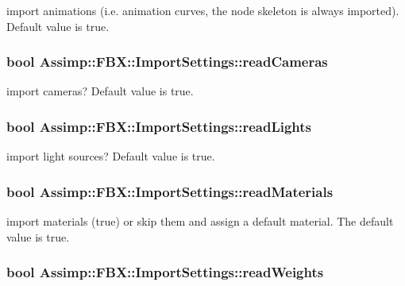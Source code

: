 import animations (i.\+e. animation curves, the node skeleton is always imported). Default value is true. \hypertarget{struct_assimp_1_1_f_b_x_1_1_import_settings_a79feafd0be973cb9b0023febe4ee3b7b}{
\subsubsection[{read\+Cameras}]{\setlength{\rightskip}{0pt plus 5cm}bool Assimp\+::\+F\+B\+X\+::\+Import\+Settings\+::read\+Cameras}}\label{struct_assimp_1_1_f_b_x_1_1_import_settings_a79feafd0be973cb9b0023febe4ee3b7b}
import cameras? Default value is true. \hypertarget{struct_assimp_1_1_f_b_x_1_1_import_settings_a0cb7d2b9a85eca0d39fff7da3e347def}{
\subsubsection[{read\+Lights}]{\setlength{\rightskip}{0pt plus 5cm}bool Assimp\+::\+F\+B\+X\+::\+Import\+Settings\+::read\+Lights}}\label{struct_assimp_1_1_f_b_x_1_1_import_settings_a0cb7d2b9a85eca0d39fff7da3e347def}
import light sources? Default value is true. \hypertarget{struct_assimp_1_1_f_b_x_1_1_import_settings_a49a15745389fdc255551ab3a0b02ad8d}{
\subsubsection[{read\+Materials}]{\setlength{\rightskip}{0pt plus 5cm}bool Assimp\+::\+F\+B\+X\+::\+Import\+Settings\+::read\+Materials}}\label{struct_assimp_1_1_f_b_x_1_1_import_settings_a49a15745389fdc255551ab3a0b02ad8d}
import materials (true) or skip them and assign a default material. The default value is true. \hypertarget{struct_assimp_1_1_f_b_x_1_1_import_settings_a6de6932ff149210d35446f325c3e3993}{
\subsubsection[{read\+Weights}]{\setlength{\rightskip}{0pt plus 5cm}bool Assimp\+::\+F\+B\+X\+::\+Import\+Settings\+::read\+Weights}}\label{struct_assimp_1_1_f_b_x_1_1_import_settings_a6de6932ff149210d35446f325c3e3993}
